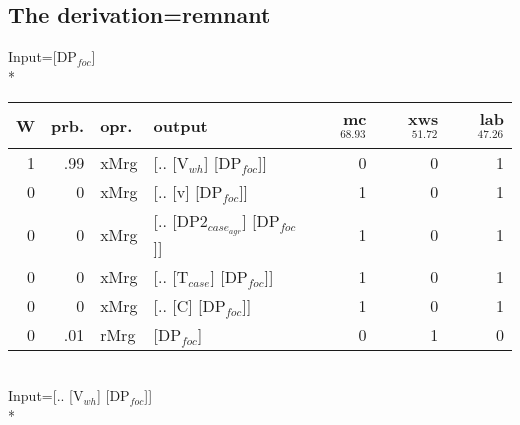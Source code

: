 \subsection{The derivation=remnant}
\begingroup\scriptsize Input=[DP$_{foc}$]\\*
\begin{tabularx}{\linewidth}{rrlXrrr}
\hline
   W &   prb. & opr.   & output                       &   mc$^{68.93}$ &   xws$^{51.72}$ &   lab$^{47.26}$ \\
\hline
   1 &   .99 & xMrg & [.. [V$_{wh}$] [DP$_{foc}$]]         &            0 &             0 &             1 \\
   0 &   0 & xMrg & [.. [v] [DP$_{foc}$]]            &            1 &             0 &             1 \\
   0 &   0 & xMrg & [.. [DP2$_{case_{agr}}$] [DP$_{foc}$]] &            1 &             0 &             1 \\
   0 &   0 & xMrg & [.. [T$_{case}$] [DP$_{foc}$]]       &            1 &             0 &             1 \\
   0 &   0 & xMrg & [.. [C] [DP$_{foc}$]]            &            1 &             0 &             1 \\
   0 &   .01 & rMrg & [DP$_{foc}$]                     &            0 &             1 &             0 \\
\hline
\end{tabularx}\endgroup\\
\begingroup\scriptsize Input=[.. [V$_{wh}$] [DP$_{foc}$]]\\*
